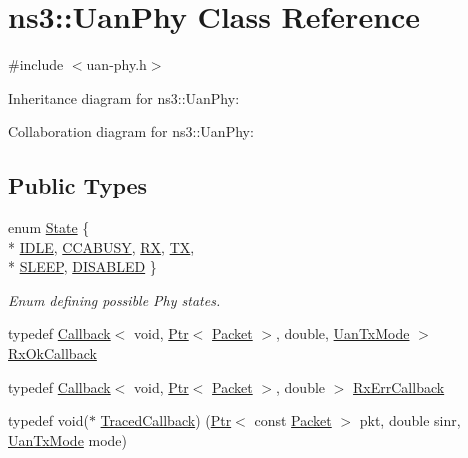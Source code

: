 \hypertarget{classns3_1_1UanPhy}{}\section{ns3\+:\+:Uan\+Phy Class Reference}
\label{classns3_1_1UanPhy}


{\ttfamily \#include $<$uan-\/phy.\+h$>$}



Inheritance diagram for ns3\+:\+:Uan\+Phy\+:


Collaboration diagram for ns3\+:\+:Uan\+Phy\+:
\subsection*{Public Types}
\begin{DoxyCompactItemize}
\item 
enum \hyperlink{classns3_1_1UanPhy_afc5e3b6b00589131e4a56ececd42bf9f}{State} \{ \\*
\hyperlink{classns3_1_1UanPhy_afc5e3b6b00589131e4a56ececd42bf9fa6143a554e834f71f498e5f781682d347}{I\+D\+LE}, 
\hyperlink{classns3_1_1UanPhy_afc5e3b6b00589131e4a56ececd42bf9fae78813f125a9e8f989861c489a798f46}{C\+C\+A\+B\+U\+SY}, 
\hyperlink{classns3_1_1UanPhy_afc5e3b6b00589131e4a56ececd42bf9fa35e2631d9c2bed2205eaa7f4da74dda8}{RX}, 
\hyperlink{classns3_1_1UanPhy_afc5e3b6b00589131e4a56ececd42bf9faab8bf12eabef757b7e77f59f71ff102c}{TX}, 
\\*
\hyperlink{classns3_1_1UanPhy_afc5e3b6b00589131e4a56ececd42bf9fa4992fce9c378d8a56ef87ca363d9a417}{S\+L\+E\+EP}, 
\hyperlink{classns3_1_1UanPhy_afc5e3b6b00589131e4a56ececd42bf9faa9eccd74ad50233a8402ed255e273361}{D\+I\+S\+A\+B\+L\+ED}
 \}\begin{DoxyCompactList}\small\item\em Enum defining possible Phy states. \end{DoxyCompactList}
\item 
typedef \hyperlink{classns3_1_1Callback}{Callback}$<$ void, \hyperlink{classns3_1_1Ptr}{Ptr}$<$ \hyperlink{classns3_1_1Packet}{Packet} $>$, double, \hyperlink{classns3_1_1UanTxMode}{Uan\+Tx\+Mode} $>$ \hyperlink{classns3_1_1UanPhy_a0b4ce695657b1c0b7f52ae474f3d98f9}{Rx\+Ok\+Callback}
\item 
typedef \hyperlink{classns3_1_1Callback}{Callback}$<$ void, \hyperlink{classns3_1_1Ptr}{Ptr}$<$ \hyperlink{classns3_1_1Packet}{Packet} $>$, double $>$ \hyperlink{classns3_1_1UanPhy_ae0da6892a65ba998fb1d649f31b118c4}{Rx\+Err\+Callback}
\item 
typedef void($\ast$ \hyperlink{classns3_1_1UanPhy_aff203b7e69331e872156ed03ec897f81}{Traced\+Callback}) (\hyperlink{classns3_1_1Ptr}{Ptr}$<$ const \hyperlink{classns3_1_1Packet}{Packet} $>$ pkt, double sinr, \hyperlink{classns3_1_1UanTxMode}{Uan\+Tx\+Mode} mode)
\end{DoxyCompactItemize}
